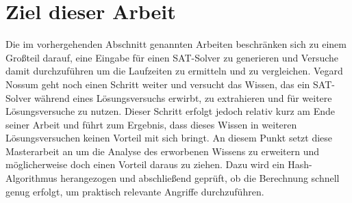 \section{Ziel dieser Arbeit}

Die im vorhergehenden Abschnitt genannten Arbeiten beschränken sich zu einem Großteil darauf, eine Eingabe für
einen SAT-Solver zu generieren und Versuche damit durchzuführen um die Laufzeiten zu ermitteln und zu vergleichen.
Vegard Nossum geht noch einen Schritt weiter und versucht das Wissen, das ein SAT-Solver während eines Lösungsversuchs
erwirbt, zu extrahieren und für weitere Lösungsversuche zu nutzen. Dieser Schritt erfolgt jedoch relativ kurz am Ende
seiner Arbeit und führt zum Ergebnis, dass dieses Wissen in weiteren Lösungsversuchen keinen Vorteil mit sich bringt.
An diesem Punkt setzt diese Masterarbeit an um die Analyse des erworbenen Wissens zu erweitern und möglicherweise doch
einen Vorteil daraus zu ziehen. Dazu wird ein Hash-Algorithmus herangezogen und abschließend geprüft, ob die Berechnung
schnell genug erfolgt, um praktisch relevante Angriffe durchzuführen.